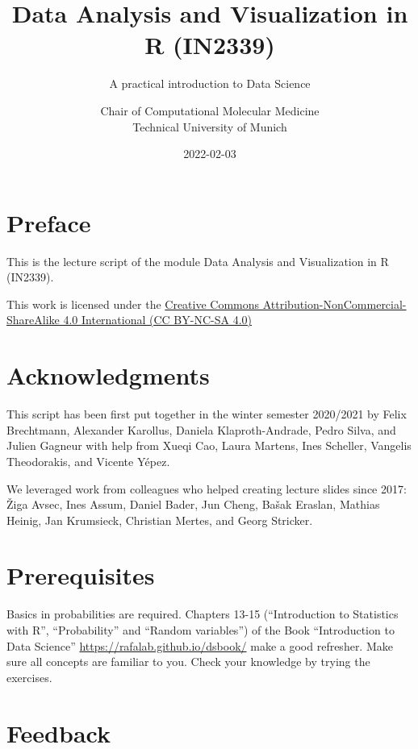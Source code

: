\documentclass[
]{krantz}
\title{Data Analysis and Visualization in R (IN2339)}
\subtitle{A practical introduction to Data Science}
\author{Chair of Computational Molecular Medicine\\
Technical University of Munich}
\date{2022-02-03}
\begin{document}
\maketitle

{
\hypersetup{linkcolor=}
\setcounter{tocdepth}{2}
\tableofcontents
}
\listoffigures
\listoftables
\hypertarget{preface}{%
\section*{Preface}\label{preface}}

This is the lecture script of the module Data Analysis and Visualization in R (IN2339).

This work is licensed under the \href{https://creativecommons.org/licenses/by-nc-sa/4.0}{Creative Commons Attribution-NonCommercial-ShareAlike 4.0 International (CC BY-NC-SA 4.0)}

\hypertarget{acknowledgments}{%
\section*{Acknowledgments}\label{acknowledgments}}

This script has been first put together in the winter semester 2020/2021 by Felix Brechtmann, Alexander Karollus, Daniela Klaproth-Andrade, Pedro Silva, and Julien Gagneur with help from Xueqi Cao, Laura Martens, Ines Scheller, Vangelis Theodorakis, and Vicente Yépez.

We leveraged work from colleagues who helped creating lecture slides since 2017: Žiga Avsec, Ines Assum, Daniel Bader, Jun Cheng, Bašak Eraslan, Mathias Heinig, Jan Krumsieck, Christian Mertes, and Georg Stricker.

\hypertarget{prerequisites}{%
\section*{Prerequisites}\label{prerequisites}}

Basics in probabilities are required. Chapters 13-15 (``Introduction to Statistics with R'', ``Probability'' and ``Random variables'') of the Book ``Introduction to Data Science'' \url{https://rafalab.github.io/dsbook/} make a good refresher. Make sure all concepts are familiar to you. Check your knowledge by trying the exercises.

\hypertarget{feedback}{%
\section*{Feedback}\label{feedback}}
\end{document}
